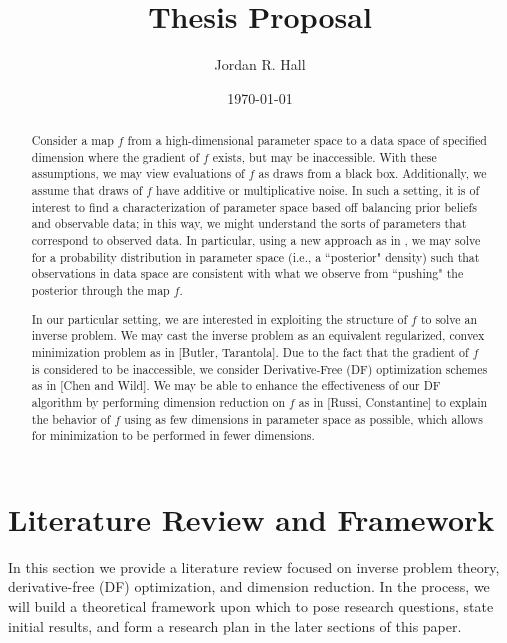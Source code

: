 \documentclass{report}
\begin{document}
\title{\bf Thesis Proposal}

\author{Jordan R. Hall}
\date{\today}

\maketitle

\begin{abstract}

Consider a map $f$ from a high-dimensional parameter space to a data space of specified dimension where the gradient of $f$ exists, but may be inaccessible. With these assumptions, we may view evaluations of $f$ as draws from a black box. Additionally, we assume that draws of $f$ have additive or multiplicative noise. In such a setting, it is of interest to find a characterization of parameter space based off balancing prior beliefs and observable data; in this way, we might understand the sorts of parameters that correspond to observed data. In particular, using a new approach as in \cite{Butler}, we may solve for a probability distribution in parameter space (i.e., a ``posterior" density) such that observations in data space are consistent with what we observe from ``pushing" the posterior through the map $f$.

In our particular setting, we are interested in exploiting the structure of $f$ to solve an inverse problem. We may cast the inverse problem as an equivalent regularized, convex minimization problem as in [Butler, Tarantola]. Due to the fact that the gradient of $f$ is considered to be inaccessible, we consider Derivative-Free (DF) optimization schemes as in [Chen and Wild]. We may be able to enhance the effectiveness of our DF algorithm by performing dimension reduction on $f$ as in [Russi, Constantine] to explain the behavior of $f$ using as few dimensions in parameter space as possible, which allows for minimization to be performed in fewer dimensions. 



 
\end{abstract}





\tableofcontents

\newpage
\section{Literature Review and Framework}

In this section we provide a literature review focused on inverse problem theory, derivative-free (DF) optimization, and dimension reduction. In the process, we will build a theoretical framework upon which to pose research questions, state initial results, and form a research plan in the later sections of this paper.
\end{document}
